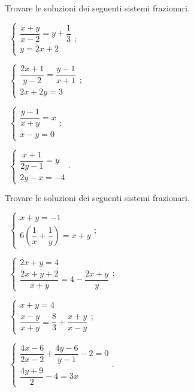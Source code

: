 \begin{esercizio}[\Ast]
 \label{ese:6.18}
Trovare le soluzioni dei seguenti sistemi frazionari.
\begin{multicols}{2}
 \begin{enumeratea}{\spazielenx
 \item~$\left\{\begin{array}{l}\dfrac{x+y}{x-2}=y+\dfrac 1 3\\y=2x+2\end{array}\right.$;
 \item~$\left\{\begin{array}{l}\dfrac{2x+1}{y-2}=\dfrac{y-1}{x+1}\\2x+2y=3\end{array}\right.$;
 \item~$\left\{\begin{array}{l}\dfrac{y-1}{x+y}=x\\x-y=0\end{array}\right.$;
 \item~$\left\{\begin{array}{l}\dfrac{x+1}{2y-1}=y\\2y-x=-4\end{array}\right.$.}
 \end{enumeratea}
 \end{multicols}
\end{esercizio}

\begin{esercizio}[\Ast]
 \label{ese:6.19}
Trovare le soluzioni dei seguenti sistemi frazionari.
\begin{multicols}{2}
 \begin{enumeratea}{\spazielenx
 \item~$\left\{\begin{array}{l}x+y=-1\\6\left(\dfrac{1}{x}+\dfrac{1}{y}\right)=x+y\end{array}\right.$;
 \item~$\left\{\begin{array}{l}2x+y=4\\\dfrac{2x+y+2}{x+y}=4-\dfrac{2x+y}{y}\end{array}\right.$;
 \item~$\left\{\begin{array}{l}x+y=4\\\dfrac{x-y}{x+y}=\dfrac{8}{3}+\dfrac{x+y}{x-y}\end{array}\right.$;
 \item~$\left\{\begin{array}{l}\dfrac{4x-6}{2x-2}+\dfrac{4y-6}{y-1}-2=0\\\dfrac{4y+9}{2}-4=3x\end{array}\right.$.}
 \end{enumeratea}
 \end{multicols}
\end{esercizio}

